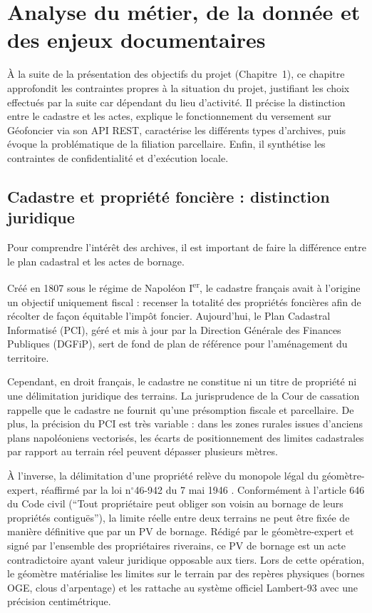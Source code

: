 
\section{Analyse du métier, de la donnée et des enjeux documentaires}
\label{sec:analyse_metier}

À la suite de la présentation des objectifs du projet (Chapitre~1), ce chapitre approfondit les contraintes propres à la situation du projet, justifiant les choix effectués par la suite car dépendant du lieu d'activité. Il précise la distinction entre le cadastre et les actes, explique le fonctionnement du versement sur Géofoncier via son API REST, caractérise les différents types d'archives, puis évoque la problématique de la filiation parcellaire. Enfin, il synthétise les contraintes de confidentialité et d'exécution locale.

\subsection{Cadastre et propriété foncière : distinction juridique}

Pour comprendre l'intérêt des archives, il est important de faire la différence entre le plan cadastral et les actes de bornage.

Créé en 1807 sous le régime de Napoléon I\textsuperscript{er}, le cadastre français avait à l'origine un objectif uniquement fiscal : recenser la totalité des propriétés foncières afin de récolter de façon équitable l'impôt foncier. Aujourd'hui, le Plan Cadastral Informatisé (PCI), géré et mis à jour par la Direction Générale des Finances Publiques (DGFiP), sert de fond de plan de référence pour l'aménagement du territoire.

Cependant, en droit français, le cadastre ne constitue ni un titre de propriété ni une délimitation juridique des terrains. La jurisprudence de la Cour de cassation rappelle que le cadastre ne fournit qu'une présomption fiscale et parcellaire. De plus, la précision du PCI est très variable : dans les zones rurales issues d'anciens plans napoléoniens vectorisés, les écarts de positionnement des limites cadastrales par rapport au terrain réel peuvent dépasser plusieurs mètres.


À l'inverse, la délimitation d'une propriété relève du monopole légal du géomètre-expert, réaffirmé par la loi n$^\circ$46-942 du 7 mai 1946 \citep{loi_1946_geometre}. Conformément à l'article 646 du Code civil (\enquote{Tout propriétaire peut obliger son voisin au bornage de leurs propriétés contiguës}), la limite réelle entre deux terrains ne peut être fixée de manière définitive que par un PV de bornage. Rédigé par le géomètre-expert et signé par l'ensemble des propriétaires riverains, ce PV de bornage est un acte contradictoire ayant valeur juridique opposable aux tiers. Lors de cette opération, le géomètre matérialise les limites sur le terrain par des repères physiques (bornes OGE, clous d'arpentage) et les rattache au système officiel Lambert-93 avec une précision centimétrique.

